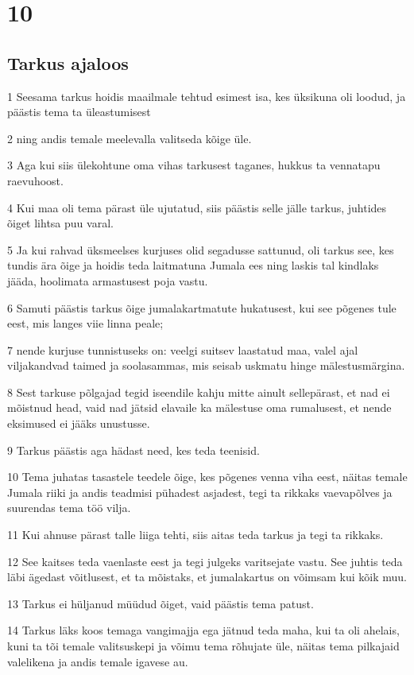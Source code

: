 \chapter{10}

\section*{Tarkus ajaloos}

\par 1 Seesama tarkus hoidis maailmale tehtud esimest isa, kes üksikuna oli loodud, ja päästis tema ta üleastumisest
\par 2 ning andis temale meelevalla valitseda kõige üle.
\par 3 Aga kui siis ülekohtune oma vihas tarkusest taganes, hukkus ta vennatapu raevuhoost.
\par 4 Kui maa oli tema pärast üle ujutatud, siis päästis selle jälle tarkus, juhtides õiget lihtsa puu varal.
\par 5 Ja kui rahvad üksmeelses kurjuses olid segadusse sattunud, oli tarkus see, kes tundis ära õige ja hoidis teda laitmatuna Jumala ees ning laskis tal kindlaks jääda, hoolimata armastusest poja vastu.
\par 6 Samuti päästis tarkus õige jumalakartmatute hukatusest, kui see põgenes tule eest, mis langes viie linna peale;
\par 7 nende kurjuse tunnistuseks on: veelgi suitsev laastatud maa, valel ajal viljakandvad taimed ja soolasammas, mis seisab uskmatu hinge mälestusmärgina.
\par 8 Sest tarkuse põlgajad tegid iseendile kahju mitte ainult sellepärast, et nad ei mõistnud head, vaid nad jätsid elavaile ka mälestuse oma rumalusest, et nende eksimused ei jääks unustusse.
\par 9 Tarkus päästis aga hädast need, kes teda teenisid.
\par 10 Tema juhatas tasastele teedele õige, kes põgenes venna viha eest, näitas temale Jumala riiki ja andis teadmisi pühadest asjadest, tegi ta rikkaks vaevapõlves ja suurendas tema töö vilja.
\par 11 Kui ahnuse pärast talle liiga tehti, siis aitas teda tarkus ja tegi ta rikkaks.
\par 12 See kaitses teda vaenlaste eest ja tegi julgeks varitsejate vastu. See juhtis teda läbi ägedast võitlusest, et ta mõistaks, et jumalakartus on võimsam kui kõik muu.
\par 13 Tarkus ei hüljanud müüdud õiget, vaid päästis tema patust.
\par 14 Tarkus läks koos temaga vangimajja ega jätnud teda maha, kui ta oli ahelais, kuni ta tõi temale valitsuskepi ja võimu tema rõhujate üle, näitas tema pilkajaid valelikena ja andis temale igavese au. 

